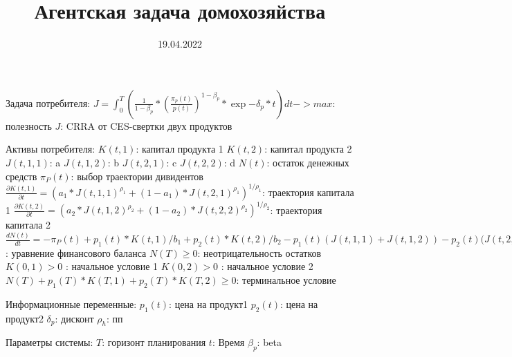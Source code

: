 \documentclass[12pt]{article}
\title{Агентская задача домохозяйства}
\date{19.04.2022}
\begin{document}
Задача потребителя:
    $J = \int_0^T (\frac{1}{1-\beta_p} * (\frac{\pi_p(t)}{p(t)})^{1-\beta_p} * \exp{-\delta_p * t})dt -> max$: полезность
    $J$: CRRA от CES-свертки двух продуктов

Активы потребителя:
    $K(t, 1)$: капитал продукта 1
    $K(t, 2)$: капитал продукта 2
    $J(t, 1, 1)$: a
    $J(t, 1, 2)$: b
    $J(t, 2, 1)$: c
    $J(t, 2, 2)$: d
    $N(t)$: остаток денежных средств
    $\pi_{P}(t)$: выбор траектории дивидентов
    $\frac{\partial K(t,1)}{\partial t} = (a_{1} * J(t, 1, 1)^{\rho_{1}}+(1-a_{1}) * J(t,2,1)^{\rho_{1}})^{1 / \rho_{1}}$: траектория капитала 1
    $\frac{\partial K(t,2)}{\partial t} = (a_{2} * J(t, 1, 2)^{\rho_{2}}+(1-a_{2}) * J(t,2,2)^{\rho_{2}})^{1 / \rho_{2}}$: траектория капитала 2
    $\frac{dN(t)}{dt} = - \pi_{P}(t) + p_{1}(t)*K(t,1)/b_{1} + p_{2}(t)*K(t,2)/b_{2} - p_{1}(t)(J(t,1,1) + J(t,1,2)) - p_{2}(t)(J(t,2,1) + J(t,2,2)$: уравнение финансового баланса
    $N(T) \geq 0$: неотрицательность остатков
    $K(0,1) > 0$ : начальное условие 1
    $K(0,2) > 0$ : начальное условие 2
    $N(T) + p_{1}(T)*K(T, 1) + p_{2}(T)*K(T,2) \geq 0 $: терминальное условие

Информационные переменные:
    $p_{1}(t)$: цена на продукт1
    $p_{2}(t)$: цена на продукт2
    $\delta_p$: дисконт
    $\rho_h$: пп

Параметры системы:
    $T$: горизонт планирования
    $t$: Время
    $\beta_p$: beta
\end{document}
